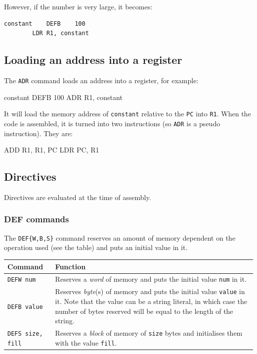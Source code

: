 However, if the number is very large, it becomes:

\begin{verbatim}
constant	DEFB	100
		LDR	R1, constant
\end{verbatim}

\subsection{Loading an address into a register}

The {\tt ADR} command loads an address into a register, for example:

\begin{listing}{1}
constant	DEFB	100
		ADR	R1, constant
\end{listing}

It will load the memory address of {\tt constant} relative to the {\tt PC} into
{\tt R1}. When the code is assembled, it is turned into two instructions (so
{\tt ADR} is a pseudo instruction). They are:

\begin{listing}{1}
	ADD R1, R1, PC
	LDR PC, R1
\end{listing}

\subsection{Directives}
Directives are evaluated at the time of assembly.

\subsubsection{DEF commands}

The {\tt DEF\{W,B,S\}} command reserves an amount of memory dependent on the
operation used (see the table) and puts an initial value in it.

\begin{tabularx}{\textwidth}{l|X}
	{\bf Command} & {\bf Function}\\ \hline

	{\tt DEFW num} & Reserves a {\it word} of memory and puts the initial
	value {\tt num} in it.\\ \hline

	{\tt DEFB value} & Reserves {\it byte}(s) of memory and puts the initial
	value {\tt value} in it. Note that the value can be a string literal, in
	which case the number of bytes reserved will be equal to the length of the
	string.\\ \hline

	{\tt DEFS size, fill} & Reserves a {\it block} of memory of {\tt size}
	bytes and initialises them with the value {\tt fill}. \\ \hline	
\end{tabularx}

